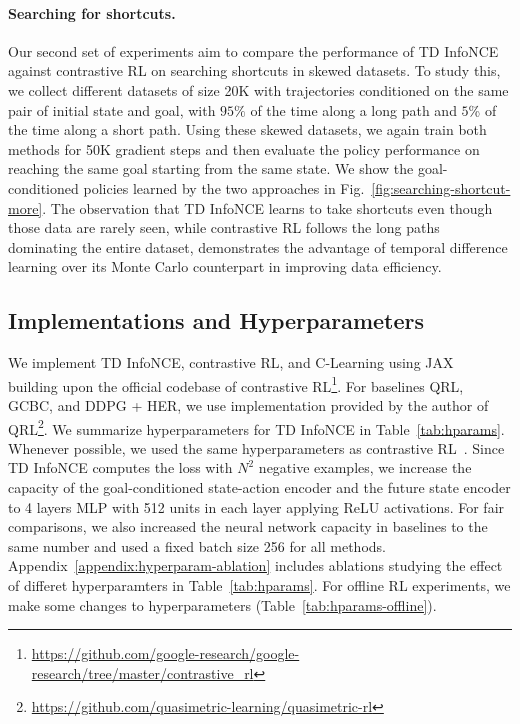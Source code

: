 \documentclass{article} %
\begin{document}
\paragraph{Searching for shortcuts.} Our second set of experiments aim to compare the performance of TD InfoNCE against contrastive RL on searching shortcuts in skewed datasets. To study this, we collect different datasets of size 20K with trajectories conditioned on the same pair of initial state and goal, with $95\%$ of the time along a long path and $5$\% of the time along a short path. Using these skewed datasets, we again train both methods for 50K gradient steps and then evaluate the policy performance on reaching the same goal starting from the same state. We show the goal-conditioned policies learned by the two approaches in Fig.~\ref{fig:searching-shortcut-more}. The observation that TD InfoNCE learns to take shortcuts even though those data are rarely seen, while contrastive RL follows the long paths dominating the entire dataset, demonstrates the advantage of temporal difference learning over its Monte Carlo counterpart in improving data efficiency.

\subsection{Implementations and Hyperparameters}

We implement TD InfoNCE, contrastive RL, and C-Learning using JAX~\citep{bradbury2018jax} building upon the official codebase of contrastive RL\footnote{\href{https://github.com/google-research/google-research/tree/master/contrastive_rl}{https://github.com/google-research/google-research/tree/master/contrastive\_rl}}. For baselines QRL, GCBC, and DDPG + HER, we use implementation provided by the author of QRL\footnote{\href{https://github.com/quasimetric-learning/quasimetric-rl}{https://github.com/quasimetric-learning/quasimetric-rl}}. We summarize hyperparameters for TD InfoNCE in Table~\ref{tab:hparams}. Whenever possible, we used the same hyperparameters as contrastive RL~\citep{eysenbach2022contrastive}. Since TD InfoNCE computes the loss with $N^2$ negative examples, we increase the capacity of the goal-conditioned state-action encoder and the future state encoder to 4 layers MLP with 512 units in each layer applying ReLU activations. For fair comparisons, we also increased the neural network capacity in baselines to the same number and used a fixed batch size 256 for all methods. Appendix~\ref{appendix:hyperparam-ablation} includes ablations studying the effect of differet hyperparamters in Table~\ref{tab:hparams}. For offline RL experiments, we make some changes to hyperparameters (Table~\ref{tab:hparams-offline}).
\end{document}
